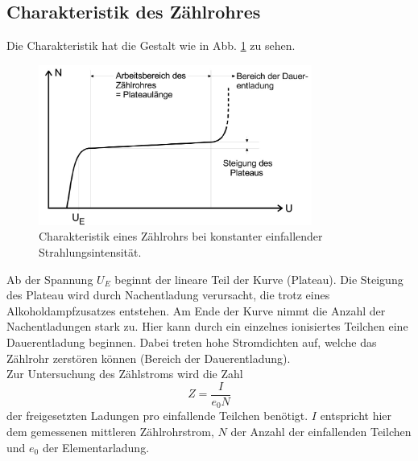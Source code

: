\subsection{Charakteristik des Zählrohres}
Die Charakteristik hat die Gestalt wie in Abb. \ref{fig:charakteristik} zu sehen.
\begin{figure}
    \centering
    \includegraphics[width=0.8\textwidth]{content/data/charakteristik.jpg}
    \caption{Charakteristik eines Zählrohrs bei konstanter einfallender Strahlungsintensität. \cite[5]{anleitung}}
    \label{fig:charakteristik}
\end{figure}
Ab der Spannung $U_E$ beginnt der lineare Teil der Kurve (Plateau).
Die Steigung des Plateau wird durch Nachentladung verursacht, die trotz eines Alkoholdampfzusatzes entstehen.
Am Ende der Kurve nimmt die Anzahl der Nachentladungen stark zu.
Hier kann durch ein einzelnes ionisiertes Teilchen eine Dauerentladung beginnen.
Dabei treten hohe Stromdichten auf, welche das Zählrohr zerstören können (Bereich der Dauerentladung).
\\
Zur Untersuchung des Zählstroms wird die Zahl
\begin{equation}
    Z = \frac{I}{e_0 N}
    \label{eqn:Z}
\end{equation}
der freigesetzten Ladungen pro einfallende Teilchen benötigt.
$I$ entspricht hier dem gemessenen mittleren Zählrohrstrom, $N$ der Anzahl der einfallenden Teilchen und $e_0$ der Elementarladung.
